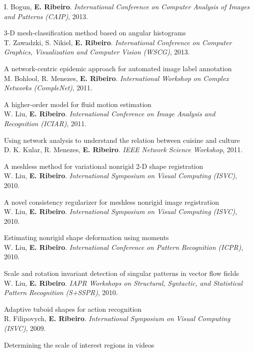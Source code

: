 \documentclass[11pt]{article}
\begin{document}
\begin{cvitems}
  I. Bogun, \textbf{E. Ribeiro}. \textit{International Conference on Computer Analysis of Images and Patterns (CAIP)}, 2013.
  \item 3-D mesh-classification method based on angular histograms\\
  T. Zawadzki, S. Nikiel, \textbf{E. Ribeiro}. \textit{International Conference on Computer Graphics, Visualization and Computer Vision (WSCG)}, 2013.
  \item A network-centric epidemic approach for automated image label annotation\\
  M. Bohlool, R. Menezes, \textbf{E. Ribeiro}. \textit{International Workshop on Complex Networks (CompleNet)}, 2011.
  \item A higher-order model for fluid motion estimation\\
  W. Liu, \textbf{E. Ribeiro}. \textit{International Conference on Image Analysis and Recognition (ICIAR)}, 2011.
  \item Using network analysis to understand the relation between cuisine and culture\\
  D. K. Kular, R. Menezes, \textbf{E. Ribeiro}. \textit{IEEE Network Science Workshop}, 2011.
  \item A meshless method for variational nonrigid 2-D shape registration\\
  W. Liu, \textbf{E. Ribeiro}. \textit{International Symposium on Visual Computing (ISVC)}, 2010.
  \item A novel consistency regularizer for meshless nonrigid image registration\\
  W. Liu, \textbf{E. Ribeiro}. \textit{International Symposium on Visual Computing (ISVC)}, 2010.
  \item Estimating nonrigid shape deformation using moments\\
  W. Liu, \textbf{E. Ribeiro}. \textit{International Conference on Pattern Recognition (ICPR)}, 2010.
  \item Scale and rotation invariant detection of singular patterns in vector flow fields\\
  W. Liu, \textbf{E. Ribeiro}. \textit{IAPR Workshops on Structural, Syntactic, and Statistical Pattern Recognition (S+SSPR)}, 2010.
  \item Adaptive tuboid shapes for action recognition\\
  R. Filipovych, \textbf{E. Ribeiro}. \textit{International Symposium on Visual Computing (ISVC)}, 2009.
  \item Determining the scale of interest regions in videos\\

\end{cvitems}
\end{document}
